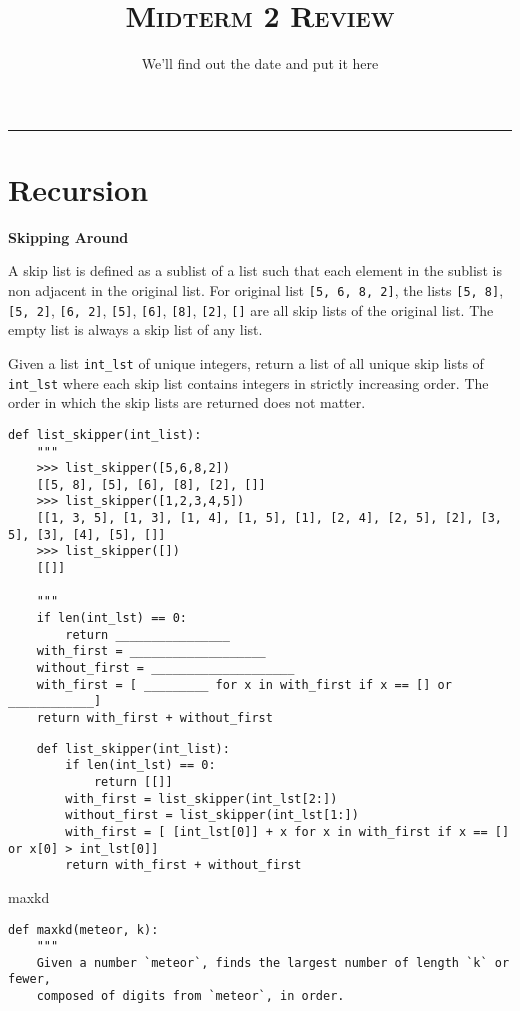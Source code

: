 \documentclass{exam}
\title{\textsc{Midterm 2 Review}}
\date{We'll find out the date and put it here }
\begin{document}
	\maketitle
	\rule{\textwidth}{0.15em}
	\fontsize{12}{15}\selectfont


\section{Recursion}
\begin{questions}
\begin{blocksection}
\question \textbf{Skipping Around}

A skip list is defined as a sublist of a list such that each element in the sublist is non adjacent in the
original list. For original list \lstinline{[5, 6, 8, 2]}, the lists \lstinline{[5, 8]}, \lstinline{[5, 2]}, \lstinline{[6, 2]}, \lstinline{[5]}, \lstinline{[6]}, \lstinline{[8]}, \lstinline{[2]}, \lstinline{[]} are
all skip lists of the original list. The empty list is always a skip list of any list.

Given a list \lstinline{int_lst} of unique integers, return a list of all unique skip lists of \lstinline{int_lst} where each skip
list contains integers in strictly increasing order. The order in which the skip lists are returned does not matter.
	
\begin{lstlisting}
def list_skipper(int_list):
	"""
	>>> list_skipper([5,6,8,2])
	[[5, 8], [5], [6], [8], [2], []]
	>>> list_skipper([1,2,3,4,5])
	[[1, 3, 5], [1, 3], [1, 4], [1, 5], [1], [2, 4], [2, 5], [2], [3, 5], [3], [4], [5], []]
	>>> list_skipper([])
	[[]]

	"""
	if len(int_lst) == 0:
		return ________________
	with_first = ___________________
	without_first = ____________________
	with_first = [ _________ for x in with_first if x == [] or ____________]
	return with_first + without_first
\end{lstlisting}
\end{blocksection}
\begin{solution}
	\begin{lstlisting}
	def list_skipper(int_list):
		if len(int_lst) == 0:
			return [[]]
		with_first = list_skipper(int_lst[2:])
		without_first = list_skipper(int_lst[1:])
		with_first = [ [int_lst[0]] + x for x in with_first if x == [] or x[0] > int_lst[0]]
		return with_first + without_first
	\end{lstlisting}
\end{solution}
\question maxkd
\begin{blocksection}
\begin{lstlisting}
def maxkd(meteor, k):
	"""
	Given a number `meteor`, finds the largest number of length `k` or fewer,
	composed of digits from `meteor`, in order.


\end{lstlisting}
\end{blocksection}
\end{questions}
\end{document}
